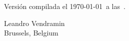 
\medskip
Versión compilada el \today~a las~\currenttime.

\begin{flushright}
Leandro Vendramin\\Brussels, Belgium\par
\end{flushright}